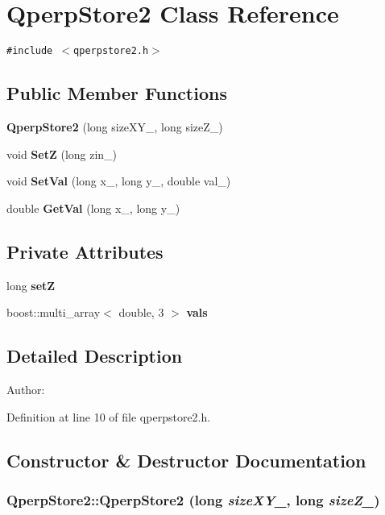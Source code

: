 \section{QperpStore2 Class Reference}
\label{classQperpStore2}
{\tt \#include $<$qperpstore2.h$>$}

\subsection*{Public Member Functions}
\begin{CompactItemize}
\item 
{\bf QperpStore2} (long sizeXY\_\-, long sizeZ\_\-)
\item 
void {\bf SetZ} (long zin\_\-)
\item 
void {\bf SetVal} (long x\_\-, long y\_\-, double val\_\-)
\item 
double {\bf GetVal} (long x\_\-, long y\_\-)
\end{CompactItemize}
\subsection*{Private Attributes}
\begin{CompactItemize}
\item 
long {\bf setZ}
\item 
boost::multi\_\-array$<$ double, 3 $>$ {\bf vals}
\end{CompactItemize}


\subsection{Detailed Description}
\begin{Desc}
\item[Author:]\end{Desc}


Definition at line 10 of file qperpstore2.h.

\subsection{Constructor \& Destructor Documentation}
\subsubsection{\setlength{\rightskip}{0pt plus 5cm}QperpStore2::QperpStore2 (long {\em sizeXY\_\-}, long {\em sizeZ\_\-})}\label{classQperpStore2_77a508d8dad963a7e4d574e501e2f9b1}




